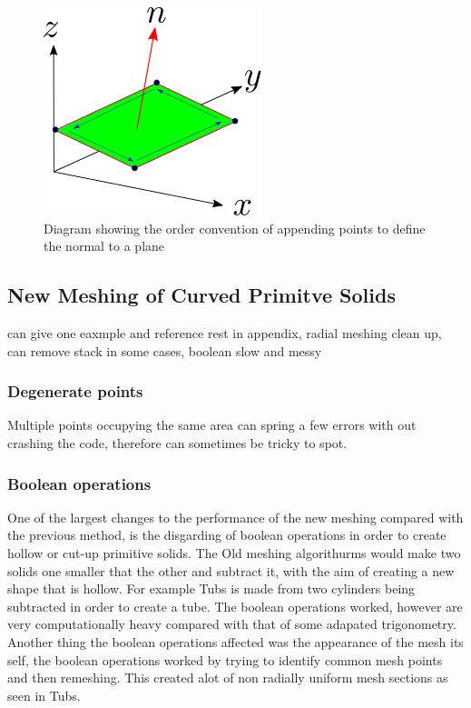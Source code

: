 \documentclass[12pt,a4paper]{article}
\begin{document}
\begin{figure}[h!]
\centering
\includegraphics[scale=0.75]{Images//append_points//Point_Appending_Order.png}
\caption[width=\columnwidth]{Diagram showing the order convention of appending points to define the normal to a plane}
\label{pointsorder}
\end{figure}



\subsection{New Meshing of Curved Primitve Solids}
can give one eaxmple and reference rest in appendix, radial meshing clean up, can remove stack in some cases, boolean slow and messy
\subsubsection{Degenerate points}
Multiple points occupying the same area can spring a few errors with out crashing the code, therefore can sometimes be tricky to spot. 

\subsubsection{Boolean operations}
One of the largest changes to the performance of the new meshing compared with the previous method, is the disgarding of boolean operations in order to create hollow or cut-up primitive solids. The Old meshing algorithurms would make two solids one smaller that the other and subtract it, with the aim of creating a new shape that is hollow. For example Tubs is made from two cylinders being subtracted in order to create a tube. The boolean operations worked, however are very computationally heavy compared with that of some adapated trigonometry. Another thing the boolean operations affected was the appearance of the mesh its self, the boolean operations worked by trying to identify common mesh points and then remeshing. This created alot of non radially uniform mesh sections as seen in Tubs.
\end{document}
